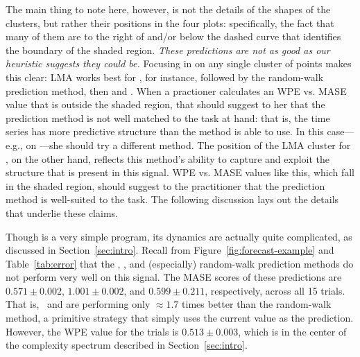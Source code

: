 The main thing to note here, however, is not the details of the shapes
of the clusters, but rather their positions in the four plots:
specifically, the fact that many of them are to the right of and/or
below the dashed curve that identifies the boundary of the shaded
region.  \emph{These predictions are not as good as our heuristic
  suggests they could be.}  Focusing in on any single cluster of
points makes this clear: LMA works best for \svdsix, for instance,
followed by the random-walk prediction method, then \arima and \naive.
When a practioner calculates an WPE vs. MASE value that is outside the
shaded region, that should suggest to her that the prediction method
is not well matched to the task at hand: that is, the time series has
more predictive structure than the method is able to use.
%
%
In this case---e.g., \arima on \svdsix---she should try a different
method.  The position of the LMA cluster for \svdsix, on the other
hand, reflects this method's ability to capture and exploit the
structure that is present in this signal.  WPE vs. MASE values like
this, which fall in the shaded region, should suggest to the
practitioner that the prediction method is well-suited to the task.
The following discussion lays out the details that underlie these
claims.
%
%

Though \col is a very simple program, its dynamics are actually quite
complicated, as discussed in Section~\ref{sec:intro}.  Recall from
Figure~\ref{fig:forecast-example} and Table~\ref{tab:error} that the
\naive, \arima, and (especially) random-walk prediction methods do not
perform very well on this signal.  The MASE scores of these
predictions are $0.571 \pm 0.002$, $1.001 \pm 0.002$, and $0.599 \pm
0.211$, respectively, across all 15 trials.  That is, \naive ~and
\arima are performing only $\approx 1.7$ times better than the
random-walk method, a primitive strategy that simply uses the current
value as the prediction.  However, the WPE value for the \col trials
is $0.513 \pm 0.003$, which is in the center of the complexity
spectrum described in Section~\ref{sec:intro}.

